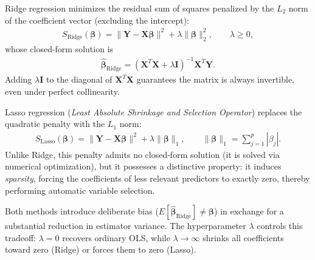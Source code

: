 \begin{definicion}
	Ridge regression minimizes the residual sum of squares penalized by the $L_2$ norm of the coefficient vector (excluding the intercept):
	\begin{align}
		S_{\text{Ridge}}(\boldsymbol{\beta}) = \|\mathbf{Y}-\mathbf{X}\boldsymbol{\beta}\|^2 + \lambda\|\boldsymbol{\beta}\|_2^2, \qquad \lambda\geq0,
	\end{align}
	whose closed-form solution is
	\begin{align}
		\hat{\boldsymbol{\beta}}_{\text{Ridge}} = (\mathbf{X}^T\mathbf{X}+\lambda\mathbf{I})^{-1}\mathbf{X}^T\mathbf{Y}.
	\end{align}
	Adding $\lambda\mathbf{I}$ to the diagonal of $\mathbf{X}^T\mathbf{X}$ guarantees the matrix is always invertible, even under perfect collinearity.
\end{definicion}

\begin{definicion}
	Lasso regression (\emph{Least Absolute Shrinkage and Selection Operator}) replaces the quadratic penalty with the $L_1$ norm:
	\begin{align}
		S_{\text{Lasso}}(\boldsymbol{\beta}) = \|\mathbf{Y}-\mathbf{X}\boldsymbol{\beta}\|^2 + \lambda\|\boldsymbol{\beta}\|_1, \qquad \|\boldsymbol{\beta}\|_1=\sum_{j=1}^p|\beta_j|.
	\end{align}
	Unlike Ridge, this penalty admits no closed-form solution (it is solved via numerical optimization), but it possesses a distinctive property: it induces \emph{sparsity}, forcing the coefficients of less relevant predictors to exactly zero, thereby performing automatic variable selection.
\end{definicion}

\begin{observacion}
	Both methods introduce deliberate bias ($E[\hat{\boldsymbol{\beta}}_{\text{Ridge}}]\neq\boldsymbol{\beta}$) in exchange for a substantial reduction in estimator variance. The hyperparameter $\lambda$ controls this tradeoff: $\lambda=0$ recovers ordinary OLS, while $\lambda\to\infty$ shrinks all coefficients toward zero (Ridge) or forces them to zero (Lasso).
\end{observacion}
